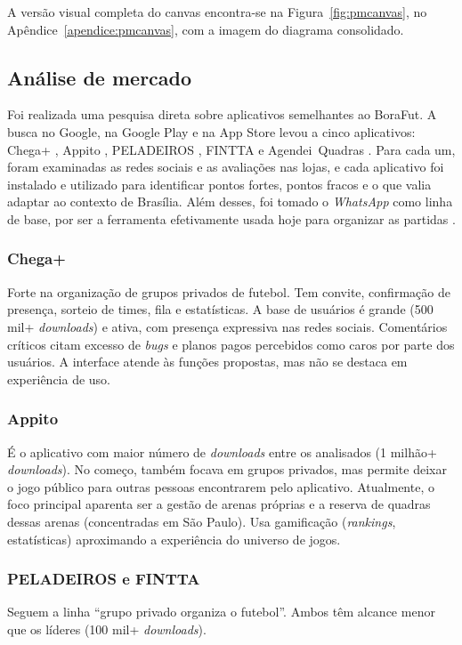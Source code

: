         \noindent A versão visual completa do canvas encontra-se na Figura~\ref{fig:pmcanvas}, no Apêndice~\ref{apendice:pmcanvas}, com a imagem do diagrama consolidado.

    \subsection{Análise de mercado}
        Foi realizada uma pesquisa direta sobre aplicativos semelhantes ao BoraFut. A busca no Google, na Google Play e na App Store levou a cinco aplicativos: Chega+ \cite{chegamais_app}, Appito \cite{appito_app}, PELADEIROS \cite{peladeiros_app}, FINTTA \cite{fintta_app} e Agendei~Quadras \cite{agendei_app}. Para cada um, foram examinadas as redes sociais e as avaliações nas lojas, e cada aplicativo foi instalado e utilizado para identificar pontos fortes, pontos fracos e o que valia adaptar ao contexto de Brasília. Além desses, foi tomado o \textit{WhatsApp} como linha de base, por ser a ferramenta efetivamente usada hoje para organizar as partidas \cite{whatsapp_app}.

        \subsubsection*{Chega+}
        Forte na organização de grupos privados de futebol. Tem convite, confirmação de presença, sorteio de times, fila e estatísticas. A base de usuários é grande (500 mil+ \textit{downloads}) e ativa, com presença expressiva nas redes sociais. Comentários críticos citam excesso de \textit{bugs} e planos pagos percebidos como caros por parte dos usuários. A interface atende às funções propostas, mas não se destaca em experiência de uso.

        \subsubsection*{Appito}
        É o aplicativo com maior número de \textit{downloads} entre os analisados (1 milhão+ \textit{downloads}). No começo, também focava em grupos privados, mas permite deixar o jogo público para outras pessoas encontrarem pelo aplicativo. Atualmente, o foco principal aparenta ser a gestão de arenas próprias e a reserva de quadras dessas arenas (concentradas em São Paulo). Usa gamificação (\textit{rankings}, estatísticas) aproximando a experiência do universo de jogos.

        \subsubsection*{PELADEIROS e FINTTA}
        Seguem a linha “grupo privado organiza o futebol”. Ambos têm alcance menor que os líderes (100 mil+ \textit{downloads}).

